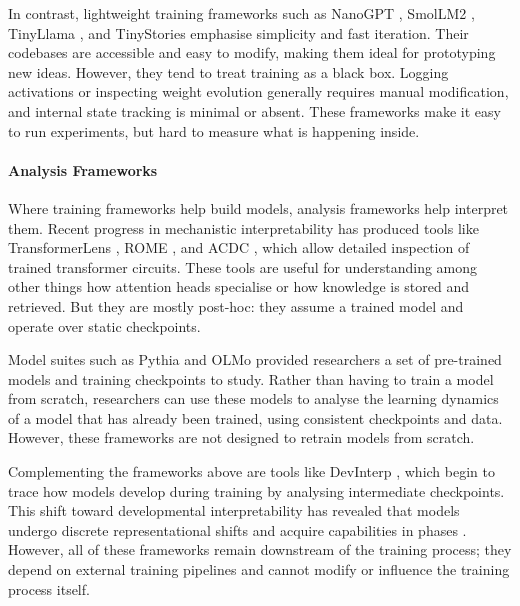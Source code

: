 In contrast, lightweight training frameworks such as NanoGPT \citep{karpathy2023nanogpt}, SmolLM2 \citep{allal2025smollm2}, TinyLlama \citep{zhang2024tinyllama}, and TinyStories \citep{eldan2023tinystories} emphasise simplicity and fast iteration. Their codebases are accessible and easy to modify, making them ideal for prototyping new ideas. However, they tend to treat training as a black box. Logging activations or inspecting weight evolution generally requires manual modification, and internal state tracking is minimal or absent. These frameworks make it easy to run experiments, but hard to measure what is happening inside.


\paragraph{Analysis Frameworks}
Where training frameworks help build models, analysis frameworks help interpret them. Recent progress in mechanistic interpretability has produced tools like TransformerLens \citep{nanda2022transformerlens}, ROME \citep{meng2022locating}, and ACDC \citep{conmy2023towards}, which allow detailed inspection of trained transformer circuits. These tools are useful for understanding among other things how attention heads specialise or how knowledge is stored and retrieved. But they are mostly post-hoc: they assume a trained model and operate over static checkpoints.

Model suites such as Pythia \citep{biderman2023pythia} and OLMo \citep{groeneveld2024olmo} provided researchers a set of pre-trained models and training checkpoints to study. Rather than having to train a model from scratch, researchers can use these models to analyse the learning dynamics of a model that has already been trained, using consistent checkpoints and data. However, these frameworks are not designed to retrain models from scratch.

Complementing the frameworks above are tools like DevInterp \citep{devinterpcode}, which begin to trace how models develop during training by analysing intermediate checkpoints. This shift toward developmental interpretability has revealed that models undergo discrete representational shifts and acquire capabilities in phases \citep{hoogland2023towards, hoogland2024losslandscape}. However, all of these frameworks remain downstream of the training process; they depend on external training pipelines and cannot modify or influence the training process itself.

